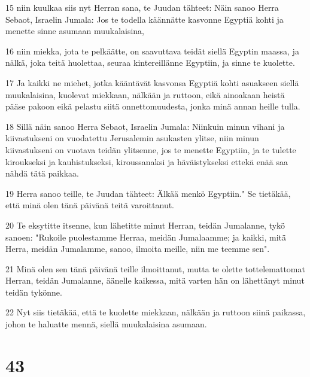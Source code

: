 \par 15 niin kuulkaa siis nyt Herran sana, te Juudan tähteet: Näin sanoo Herra Sebaot, Israelin Jumala: Jos te todella käännätte kasvonne Egyptiä kohti ja menette sinne asumaan muukalaisina,
\par 16 niin miekka, jota te pelkäätte, on saavuttava teidät siellä Egyptin maassa, ja nälkä, joka teitä huolettaa, seuraa kintereillänne Egyptiin, ja sinne te kuolette.
\par 17 Ja kaikki ne miehet, jotka kääntävät kasvonsa Egyptiä kohti asuakseen siellä muukalaisina, kuolevat miekkaan, nälkään ja ruttoon, eikä ainoakaan heistä pääse pakoon eikä pelastu siitä onnettomuudesta, jonka minä annan heille tulla.
\par 18 Sillä näin sanoo Herra Sebaot, Israelin Jumala: Niinkuin minun vihani ja kiivastukseni on vuodatettu Jerusalemin asukasten ylitse, niin minun kiivastukseni on vuotava teidän ylitsenne, jos te menette Egyptiin, ja te tulette kiroukseksi ja kauhistukseksi, kiroussanaksi ja häväistykseksi ettekä enää saa nähdä tätä paikkaa.
\par 19 Herra sanoo teille, te Juudan tähteet: Älkää menkö Egyptiin." Se tietäkää, että minä olen tänä päivänä teitä varoittanut.
\par 20 Te eksytitte itsenne, kun lähetitte minut Herran, teidän Jumalanne, tykö sanoen: "Rukoile puolestamme Herraa, meidän Jumalaamme; ja kaikki, mitä Herra, meidän Jumalamme, sanoo, ilmoita meille, niin me teemme sen".
\par 21 Minä olen sen tänä päivänä teille ilmoittanut, mutta te olette tottelemattomat Herran, teidän Jumalanne, äänelle kaikessa, mitä varten hän on lähettänyt minut teidän tykönne.
\par 22 Nyt siis tietäkää, että te kuolette miekkaan, nälkään ja ruttoon siinä paikassa, johon te haluatte mennä, siellä muukalaisina asumaan.

\chapter{43}

